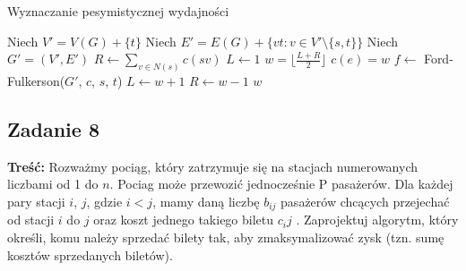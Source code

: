 \begin{algorithm}[H]
	\caption{Wyznaczanie pesymistycznej wydajności}
	\begin{algorithmic}[1]
		\State Niech $V' = V(G) + \{t\}$
		\State Niech $E' = E(G) + \{vt : v \in V' \setminus \{s, t\} \}$
		\State Niech $G' = (V', E')$
		\State $R \gets \sum_{v \in N(s)}c(sv)$
		\State $L \gets 1$
		\State $w = \lfloor \frac{L + R}{2} \rfloor$
		\State $c(e) = w$
		\EndFor 
		\State $f \gets$ Ford-Fulkerson($G'$, $c$, $s$, $t$)
		\State $L \gets w + 1$
		\Else
		\State $R \gets w - 1$
		\EndIf
		\EndWhile
		\State \Return $w$
		\EndProcedure
	\end{algorithmic}
	\label{zad46}
\end{algorithm}

\subsection{Zadanie 8}
\textbf{Treść:} Rozważmy pociąg, który zatrzymuje się na stacjach 
numerowanych liczbami od 1 do $n$. Pociag może
przewozić jednocześnie P pasażerów. Dla każdej pary stacji 
$i$, $j$, gdzie $i < j$, mamy daną liczbę $b_{ij}$ pasażerów chcących
przejechać od stacji $i$ do $j$ oraz koszt jednego takiego biletu $c_ij$ .
Zaprojektuj algorytm, który określi, komu należy sprzedać bilety tak, 
aby zmaksymalizować zysk (tzn. sumę kosztów
sprzedanych biletów).